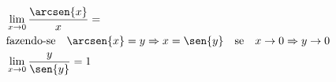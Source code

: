 \begin{ex}
\begin{align}
&\lim_{x\rightarrow 0} \frac{\arcsen{x}}{x}=\nonumber\\
&\text{fazendo-se}\quad \arcsen{x}=y \Rightarrow x=\sen{y} \quad\text{se}\quad x\rightarrow 0 \Rightarrow y\rightarrow 0\nonumber\\
&\lim_{x\rightarrow 0} \frac{y}{\sen{y}}=1\nonumber
\end{align}
\end{ex}
	
